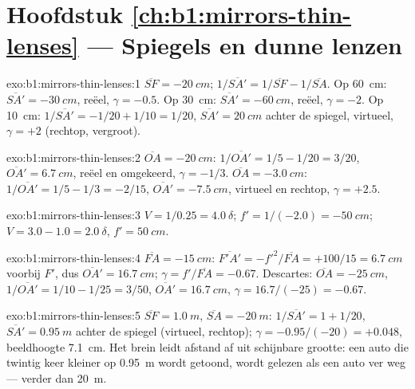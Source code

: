 \section*{Hoofdstuk \ref{ch:b1:mirrors-thin-lenses} --- Spiegels en dunne lenzen}

\begin{solution}{exo:b1:mirrors-thin-lenses:1}
$\overline{SF} = \qty{-20}{cm}$; $1/\overline{SA'} = 1/\overline{SF} -
1/\overline{SA}$. Op \qty{60}{cm}: $\overline{SA'} = \qty{-30}{cm}$,
reëel, $\gamma = -0.5$. Op \qty{30}{cm}: $\overline{SA'} = \qty{-60}{cm}$,
reëel, $\gamma = -2$. Op \qty{10}{cm}: $1/\overline{SA'} = -1/20 + 1/10
= 1/20$, $\overline{SA'} = \qty{+20}{cm}$ achter de spiegel, virtueel,
$\gamma = +2$ (rechtop, vergroot).
\end{solution}

\begin{solution}{exo:b1:mirrors-thin-lenses:2}
$\overline{OA} = \qty{-20}{cm}$: $1/\overline{OA'} = 1/5 - 1/20 = 3/20$,
$\overline{OA'} = \qty{+6.7}{cm}$, reëel en omgekeerd, $\gamma = -1/3$.
$\overline{OA} = \qty{-3.0}{cm}$: $1/\overline{OA'} = 1/5 - 1/3 = -2/15$,
$\overline{OA'} = \qty{-7.5}{cm}$, virtueel en rechtop, $\gamma = +2.5$.
\end{solution}

\begin{solution}{exo:b1:mirrors-thin-lenses:3}
$V = 1/0.25 = \qty{+4.0}{\delta}$; $f' = 1/(-2.0) = \qty{-50}{cm}$;
$V = 3.0 - 1.0 = \qty{+2.0}{\delta}$, $f' = \qty{50}{cm}$.
\end{solution}

\begin{solution}{exo:b1:mirrors-thin-lenses:4}
$\overline{FA} = \qty{-15}{cm}$: $\overline{F'A'} = -f'^2/\overline{FA}
= +100/15 = \qty{6.7}{cm}$ voorbij $F'$, dus $\overline{OA'} = \qty{16.7}{cm}$;
$\gamma = f'/\overline{FA} = -0.67$. Descartes: $\overline{OA} =
\qty{-25}{cm}$, $1/\overline{OA'} = 1/10 - 1/25 = 3/50$,
$\overline{OA'} = \qty{16.7}{cm}$, $\gamma = 16.7/(-25) = -0.67$.
\end{solution}

\begin{solution}{exo:b1:mirrors-thin-lenses:5}
$\overline{SF} = \qty{+1.0}{m}$, $\overline{SA} = \qty{-20}{m}$:
$1/\overline{SA'} = 1 + 1/20$, $\overline{SA'} = \qty{0.95}{m}$ achter
de spiegel (virtueel, rechtop); $\gamma = -0.95/(-20) = +0.048$, beeldhoogte
\qty{7.1}{cm}. Het brein leidt afstand af uit schijnbare grootte: een
auto die twintig keer kleiner op \qty{0.95}{m} wordt getoond, wordt gelezen
als een auto ver weg --- verder dan \qty{20}{m}.
\end{solution}

